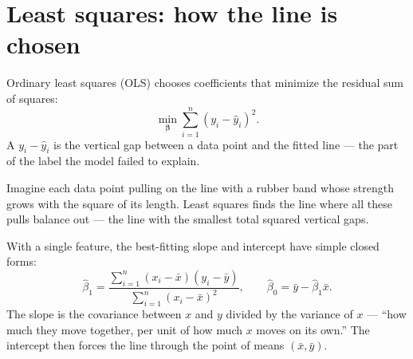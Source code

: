 \section{Least squares: how the line is chosen}

Ordinary least squares (OLS) chooses coefficients that minimize the residual sum of squares:
\[
  \min_{\bm{\beta}}
  \sum_{i=1}^{n}{(y_i-\hat{y}_i)}^2.
\]
A  $y_i-\hat{y}_i$ is the vertical gap between a data point and the fitted line --- the part of the label the model failed to explain.

\begin{mlfigure}
\end{mlfigure}

\begin{intuition}
Imagine each data point pulling on the line with a rubber band whose strength grows with the square of its length. Least squares finds the line where all these pulls balance out --- the line with the smallest total squared vertical gaps.
\end{intuition}

With a single feature, the best-fitting slope and intercept have simple closed forms:
\[
  \hat{\beta}_1
  =\frac{\sum_{i=1}^{n}(x_i-\bar{x})(y_i-\bar{y})}
        {\sum_{i=1}^{n}{(x_i-\bar{x})}^2},
  \qquad
  \hat{\beta}_0=\bar{y}-\hat{\beta}_1\bar{x}.
\]
The slope is the covariance between $x$ and $y$ divided by the variance of $x$ --- ``how much they move together, per unit of how much $x$ moves on its own.'' The intercept then forces the line through the point of means $(\bar{x},\bar{y})$.

